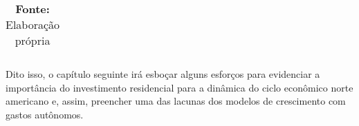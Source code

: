 \begin{table}[htb]
{\begin{tabular}{|l|ccccl|}
		\end{tabular}%
	}
\caption*{\textbf{Fonte:} Elaboração própria}
\end{table}



  Dito isso,  o capítulo seguinte irá esboçar alguns esforços para evidenciar a importância do investimento residencial para a dinâmica do ciclo econômico norte americano e, assim, preencher uma das lacunas dos modelos de crescimento com gastos autônomos.



\begin{comment}
DESCARTADOS
Revisitando a instabilidade de Harrod, \textcite{allain_macroeconomic_2014} destaca que foi tratada majoritariamente de duas formas. A primeira delas é eliminar o comportamento  ``\textit{knife-edge}'' do investimento tornando-o autônomo de modo que a taxa garantida se adeque à taxa de crescimento efetiva. No entanto, tal categorização não permite captar as distinções entre esses modelos e, por conta disso, serão discutido através dos fechamentos tal como em \textcite{serrano_long_1995} --- e revisitado por \textcite{serrano_har_2018}. No modelo de Cambridge, por exemplo, é a distribuição de renda que elimina a instabilidade harrodiana. Nos modelos Kaleckianos, por outro lado, tal eliminação  se dá pela endogeinização do grau de utilização
.
A segunda via de solução, ainda na categorização de \textcite{allain_macroeconomic_2014}, é por meio de modelos do tipo supermultiplicador que introduzem gastos autônomos que não criam capacidade\footnote{Vale destacar que a inclusão de gastos autônomos que não criam capacidade produtiva não é suficiente para que um modelo seja qualificado enquanto um supermultiplicador, mas sim, o princípio do ajuste do estoque de capital. A importância desses gasto recai sobre a estabilidade do modelo.} em que o investimento é determinado pelo princípio de ajuste do estoque de capital \cites{serrano_long_1995}{serrano_sraffian_1995}{bortis_institutions_1996}
.


\end{comment}



